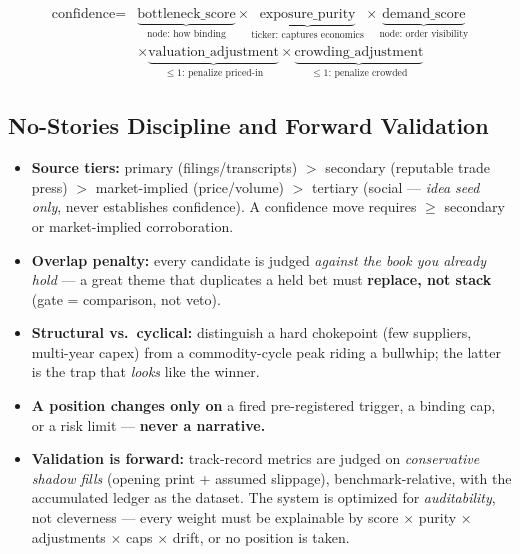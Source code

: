 \documentclass[11pt]{article}
\begin{document}
\[
  \begin{aligned}
  \text{confidence} = {}&\underbrace{\text{bottleneck\_score}}_{\text{node: how binding}}
  \times \underbrace{\text{exposure\_purity}}_{\text{ticker: captures economics}}
  \times \underbrace{\text{demand\_score}}_{\text{node: order visibility}} \\
  &\times \underbrace{\text{valuation\_adjustment}}_{\leq 1\text{: penalize priced-in}}
  \times \underbrace{\text{crowding\_adjustment}}_{\leq 1\text{: penalize crowded}}
  \end{aligned}
\]

\subsection*{No-Stories Discipline and Forward Validation}

\begin{itemize}
  \item \textbf{Source tiers:} primary (filings/transcripts) $>$ secondary (reputable trade press)
    $>$ market-implied (price/volume) $>$ tertiary (social --- \emph{idea seed only}, never
    establishes confidence). A confidence move requires $\geq$ secondary or market-implied
    corroboration.

  \item \textbf{Overlap penalty:} every candidate is judged \emph{against the book you already
    hold} --- a great theme that duplicates a held bet must \textbf{replace, not stack} (gate
    = comparison, not veto).

  \item \textbf{Structural vs.\ cyclical:} distinguish a hard chokepoint (few suppliers, multi-year
    capex) from a commodity-cycle peak riding a bullwhip; the latter is the trap that \emph{looks}
    like the winner.

  \item \textbf{A position changes only on} a fired pre-registered trigger, a binding cap, or a
    risk limit --- \textbf{never a narrative.}

  \item \textbf{Validation is forward:} track-record metrics are judged on \emph{conservative shadow
    fills} (opening print + assumed slippage), benchmark-relative, with the accumulated ledger as
    the dataset. The system is optimized for \emph{auditability}, not cleverness --- every weight
    must be explainable by score $\times$ purity $\times$ adjustments $\times$ caps $\times$ drift,
    or no position is taken.
\end{itemize}
\end{document}
